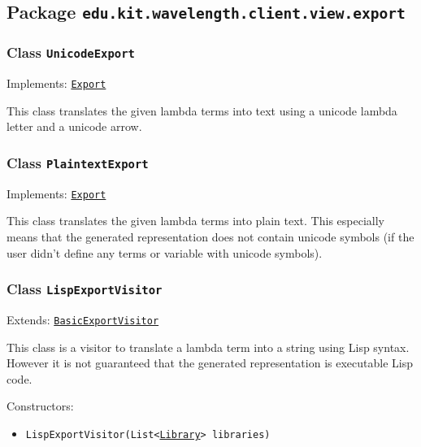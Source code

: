 \subsection{Package \lstinline{edu.kit.wavelength.client.view.export}}
\label{pkg:edu.kit.wavelength.client.view.export}


\subsubsection{Class \texttt{UnicodeExport}}
\label{type:edu.kit.wavelength.client.view.export.UnicodeExport}
Implements: \texttt{\hyperref[type:edu.kit.wavelength.client.view.export.Export]{Export}}

This class translates the given lambda terms into text using a unicode lambda
 letter and a unicode arrow.

\subsubsection{Class \texttt{PlaintextExport}}
\label{type:edu.kit.wavelength.client.view.export.PlaintextExport}
Implements: \texttt{\hyperref[type:edu.kit.wavelength.client.view.export.Export]{Export}}

This class translates the given lambda terms into plain text. This especially
 means that the generated representation does not contain unicode symbols (if
 the user didn't define any terms or variable with unicode symbols).

\subsubsection{Class \texttt{LispExportVisitor}}
\label{type:edu.kit.wavelength.client.view.export.LispExportVisitor}
Extends: \texttt{\hyperref[type:edu.kit.wavelength.client.view.export.BasicExportVisitor]{BasicExportVisitor}}

This class is a visitor to translate a lambda term into a string using Lisp
 syntax. However it is not guaranteed that the generated representation is
 executable Lisp code.

Constructors:
\begin{itemize}
\item \texttt{LispExportVisitor(List<\hyperref[type:edu.kit.wavelength.client.model.library.Library]{Library}> libraries)}



\end{itemize}

